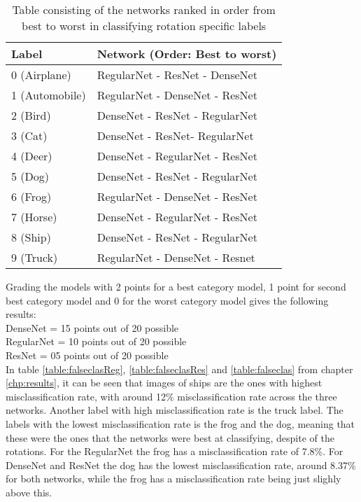 \begin{table}[]
	\centering
	\caption{Table consisting of the networks ranked in order from best to worst in classifying rotation specific labels}
	\label{table:results}
	\begin{tabular}{|l|l|}
		\hline
		Label          & Network (Order: Best to worst) \\ \hline
		0 (Airplane)   & RegularNet - ResNet - DenseNet \\ \hline
		1 (Automobile) & RegularNet - DenseNet - ResNet \\ \hline
		2 (Bird)       & DenseNet - ResNet - RegularNet \\ \hline
		3 (Cat)        & DenseNet - ResNet- RegularNet  \\ \hline
		4 (Deer)       & DenseNet - RegularNet - ResNet \\ \hline
		5 (Dog)        & DenseNet - ResNet - RegularNet \\ \hline
		6 (Frog)       & RegularNet - DenseNet - ResNet \\ \hline
		7 (Horse)      & DenseNet - RegularNet - ResNet \\ \hline
		8 (Ship)       & DenseNet - ResNet - RegularNet \\ \hline
		9 (Truck)      & RegularNet - DenseNet - Resnet \\ \hline
	\end{tabular}
\end{table}
\FloatBarrier

Grading the models with 2 points for a best category model, 1 point for second best category model and 0 for the worst category model gives the following results:\\
DenseNet   = 15 points out of 20 possible\\
RegularNet = 10 points out of 20 possible\\
ResNet     = 05 points out of 20 possible\\

In table \ref{table:falseclasReg}, \ref{table:falseclasRes} and \ref{table:falseclas} from chapter \ref{chp:results}, it can be seen that images of ships are the ones with highest misclassification rate, with around 12\% misclassification rate across the three networks.  Another label with high misclassification rate is the truck label. The labels with the lowest misclassification rate is the frog and the dog, meaning that these were the ones that the networks were best at classifying, despite of the rotations. For the RegularNet the frog has a misclassification rate of 7.8\%. For DenseNet and ResNet the dog has the lowest misclassification rate, around 8.37\% for both networks, while the frog has a misclassification rate being just slighly above this.

